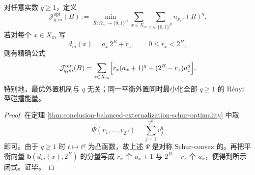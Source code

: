 \begin{corollary}\label{cor:conclusion-balanced-externalization-optimal-renyi-energy}
对任意实数 \(q\ge 1\)，定义
\[
\mathcal J_{q,m}^{\mathrm{opt}}(B)
:=
\min_{R:\Omega_m\to\{0,1\}^B}
\sum_{x\in X_m}\sum_{r\in\{0,1\}^B} n_{x,r}(R)^q.
\]
若对每个 \(x\in X_m\) 写
\[
d_m(x)=a_x\,2^B+r_x,\qquad 0\le r_x<2^B,
\]
则有精确公式
\[
\mathcal J_{q,m}^{\mathrm{opt}}(B)
=
\sum_{x\in X_m}
\Bigl[
r_x(a_x+1)^q+(2^B-r_x)a_x^q
\Bigr].
\]
特别地，最优外置机制与 \(q\) 无关；同一平衡外置同时最小化全部 \(q\ge 1\) 的 Rényi 型碰撞能量。
\end{corollary}
\begin{proof}
在定理 \ref{thm:conclusion-balanced-externalization-schur-optimality} 中取
\[
\Psi(v_1,\dots,v_{2^B})=\sum_{j=1}^{2^B}v_j^q
\]
即可。由于 \(q\ge 1\) 时 \(t\mapsto t^q\) 为凸函数，故上述 \(\Psi\) 是对称 Schur-convex 的。再把平衡向量 \(\mathbf b(d_m(x),2^B)\) 的分量写成 \(r_x\) 个 \(a_x+1\) 与 \(2^B-r_x\) 个 \(a_x\)，便得到所示闭式。证毕。
\end{proof}

